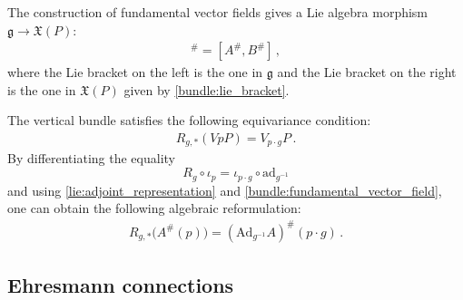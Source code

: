 
    \begin{property}
        The construction of fundamental vector fields gives a Lie algebra morphism $\mathfrak{g}\rightarrow\mathfrak{X}(P)$:
        \begin{gather}
            [A,B]^\# = [A^\#,B^\#]\,,
        \end{gather}
        where the Lie bracket on the left is the one in $\mathfrak{g}$ and the Lie bracket on the right is the one in $\mathfrak{X}(P)$ given by \cref{bundle:lie_bracket}.
    \end{property}

    \begin{property}\label{bundle:vert_g_equivariance}
        The vertical bundle satisfies the following equivariance condition:
        \begin{gather}
            R_{g,\ast}(VpP) = V_{p\cdot g}P\,.
        \end{gather}
        By differentiating the equality \[R_g\circ\iota_p = \iota_{p\cdot g}\circ\mathrm{ad}_{g^{-1}}\] and using \cref{lie:adjoint_representation} and \cref{bundle:fundamental_vector_field}, one can obtain the following algebraic reformulation:
        \begin{gather}
            R_{g,\ast}\bigl(A^\#(p)\bigr) = \left(\mathrm{Ad}_{g^{-1}}A\right)^\#(p\cdot g)\,.
        \end{gather}
    \end{property}

\subsection{Ehresmann connections}

